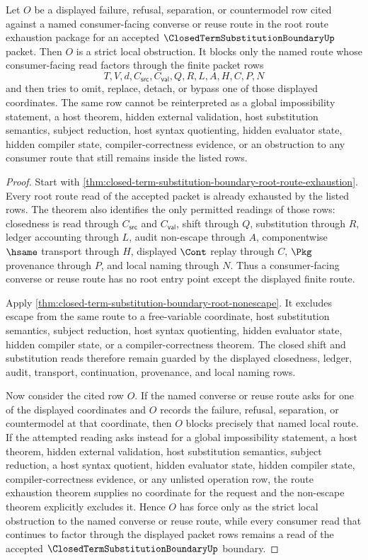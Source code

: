 \begin{corollary}
\label{cor:closed-term-substitution-boundary-root-route-strict-local-obstruction}
Let $O$ be a displayed failure, refusal, separation, or countermodel row cited against a named consumer-facing converse or reuse route in the root route exhaustion package for an accepted $\ClosedTermSubstitutionBoundaryUp$ packet. Then $O$ is a strict local obstruction. It blocks only the named route whose consumer-facing read factors through the finite packet rows
$$
T,V,d,C_{\mathsf{src}},C_{\mathsf{val}},Q,R,L,A,H,C,P,N
$$
and then tries to omit, replace, detach, or bypass one of those displayed coordinates. The same row cannot be reinterpreted as a global impossibility statement, a host theorem, hidden external validation, host substitution semantics, subject reduction, host syntax quotienting, hidden evaluator state, hidden compiler state, compiler-correctness evidence, or an obstruction to any consumer route that still remains inside the listed rows.
\end{corollary}
\begin{proof}
Start with \autoref{thm:closed-term-substitution-boundary-root-route-exhaustion}. Every root route read of the accepted packet is already exhausted by the listed rows. The theorem also identifies the only permitted readings of those rows: closedness is read through $C_{\mathsf{src}}$ and $C_{\mathsf{val}}$, shift through $Q$, substitution through $R$, ledger accounting through $L$, audit non-escape through $A$, componentwise $\hsame$ transport through $H$, displayed $\Cont$ replay through $C$, $\Pkg$ provenance through $P$, and local naming through $N$. Thus a consumer-facing converse or reuse route has no root entry point except the displayed finite route.

Apply \autoref{thm:closed-term-substitution-boundary-root-nonescape}. It excludes escape from the same route to a free-variable coordinate, host substitution semantics, subject reduction, host syntax quotienting, hidden evaluator state, hidden compiler state, or a compiler-correctness theorem. The closed shift and substitution reads therefore remain guarded by the displayed closedness, ledger, audit, transport, continuation, provenance, and local naming rows.

Now consider the cited row $O$. If the named converse or reuse route asks for one of the displayed coordinates and $O$ records the failure, refusal, separation, or countermodel at that coordinate, then $O$ blocks precisely that named local route. If the attempted reading asks instead for a global impossibility statement, a host theorem, hidden external validation, host substitution semantics, subject reduction, a host syntax quotient, hidden evaluator state, hidden compiler state, compiler-correctness evidence, or any unlisted operation row, the route exhaustion theorem supplies no coordinate for the request and the non-escape theorem explicitly excludes it. Hence $O$ has force only as the strict local obstruction to the named converse or reuse route, while every consumer read that continues to factor through the displayed packet rows remains a read of the accepted $\ClosedTermSubstitutionBoundaryUp$ boundary.
\end{proof}
